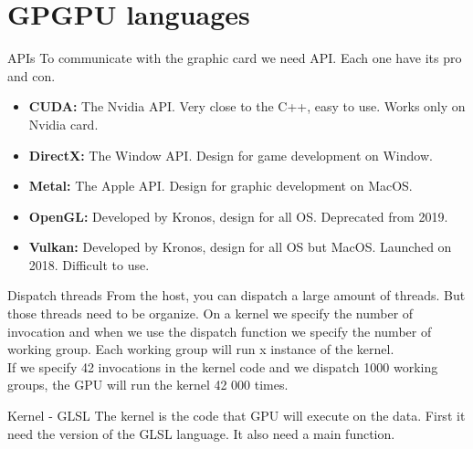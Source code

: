 \documentclass{beamer}
\begin{document}
\section{GPGPU languages}
\begin{frame}{APIs}
	To communicate with the graphic card we need API. Each one have its pro and con.
	\begin{itemize}
		\item \textbf{CUDA:} The Nvidia API. Very close to the C++, easy to use. Works only on Nvidia card.
		\item \textbf{DirectX:} The Window API. Design for game development on Window.
		\item \textbf{Metal:} The Apple API. Design for graphic development on MacOS.
		\item \textbf{OpenGL:} Developed by Kronos, design for all OS. Deprecated from 2019.
		\item \textbf{Vulkan:} Developed by Kronos, design for all OS but MacOS. Launched on 2018. Difficult to use.
	\end{itemize}
\end{frame}

\begin{frame}{Dispatch threads}
	From the host, you can dispatch a large amount of threads. But those threads need to be organize. On a kernel we specify the number of invocation and when we use the dispatch function we specify the number of working group. Each working group will run x instance of the kernel.\\
	If we specify 42 invocations in the kernel code and we dispatch 1000 working groups, the GPU will run the kernel 42 000 times.
\end{frame}



\begin{frame}{Kernel - GLSL}
	The kernel is the code that GPU will execute on the data. First it need the version of the GLSL language. It also need a main function.
	\codeKernelMain
\end{frame}

\end{document}
